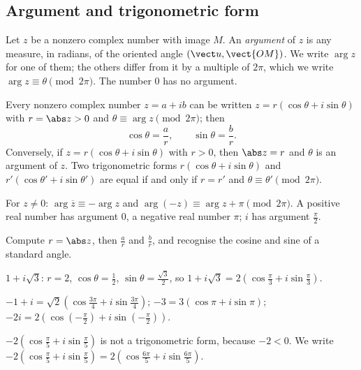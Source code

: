 \subsection{Argument and trigonometric form}
\begin{definition}[Argument]
Let $z$ be a nonzero complex number with image $M$. An \emph{argument} of $z$ is any measure, in radians, of the oriented angle $\left(\vect u,\vect{OM}\right)$. We write $\arg z$ for one of them; the others differ from it by a multiple of $2\pi$, which we write $\arg z\equiv\theta\pmod{2\pi}$. The number $0$ has no argument.
\end{definition}
\begin{theorem}
Every nonzero complex number $z=a+ib$ can be written $z=r(\cos\theta+i\sin\theta)$ with $r=\abs z>0$ and $\theta\equiv\arg z\pmod{2\pi}$; then
\[\cos\theta=\frac ar,\qquad\sin\theta=\frac br.\]
Conversely, if $z=r(\cos\theta+i\sin\theta)$ with $r>0$, then $\abs z=r$ and $\theta$ is an argument of $z$. Two trigonometric forms $r(\cos\theta+i\sin\theta)$ and $r'(\cos\theta'+i\sin\theta')$ are equal if and only if $r=r'$ and $\theta\equiv\theta'\pmod{2\pi}$.
\end{theorem}
\begin{theorem}
For $z\neq0$: $\arg\overline z\equiv-\arg z$ and $\arg(-z)\equiv\arg z+\pi\pmod{2\pi}$. A positive real number has argument $0$, a negative real number $\pi$; $i$ has argument $\frac\pi2$.
\end{theorem}
\begin{method}
Compute $r=\abs z$, then $\frac ar$ and $\frac br$, and recognise the cosine and sine of a standard angle.
\end{method}
\begin{example}
$1+i\sqrt3$: $r=2$, $\cos\theta=\frac12$, $\sin\theta=\frac{\sqrt3}2$, so $1+i\sqrt3=2\left(\cos\frac\pi3+i\sin\frac\pi3\right)$.\par
$-1+i=\sqrt2\left(\cos\frac{3\pi}4+i\sin\frac{3\pi}4\right)$; $-3=3(\cos\pi+i\sin\pi)$; $-2i=2\left(\cos\left(-\frac\pi2\right)+i\sin\left(-\frac\pi2\right)\right)$.
\end{example}
\begin{pitfall}
$-2\left(\cos\frac\pi5+i\sin\frac\pi5\right)$ is not a trigonometric form, because $-2<0$. We write $-2\left(\cos\frac\pi5+i\sin\frac\pi5\right)=2\left(\cos\frac{6\pi}5+i\sin\frac{6\pi}5\right)$.
\end{pitfall}
\begin{figurebox}[Modulus and argument of $z=a+ib$.]
\end{figurebox}
